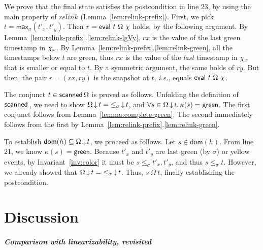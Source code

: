\documentclass[a4paper,UKenglish]{lipics-v2016}
\newcommand{\ie}{\emph{i.e.}\xspace}
\newcommand{\dom}[1]{\mathsf{dom}(#1)}
\newcommand{\aux}[1]{\textit{#1}}
\newcommand{\kw}[1]{\text{\textbf{#1}}}
\newcommand{\hist}{\chi}
\newcommand{\ldot}{\mathord{.}\,}
\def\ordlist{\sigma}
\newcommand{\C}{\kappa}
\newcommand{\tleq}{\mathrel{\leq_\ordlist}}
\newcommand{\stableorder}{\Omega}
\newcommand{\var}[1]{\mathit{#1}}
\def\lat{\langle}
\def\rat{\rangle}
\theoremstyle{definition}
\begin{document}


We prove that the final state satisfies the postcondition in line 23,
by using the main property of $\aux{relink}$
(Lemma~\ref{lem:relink-prefix}).
%
First, we pick $t = \mathsf{max}_{\ordlist}(t'_x, t'_y)$. Then $r =
\eval\ t\ \stableorder\ \hist$ holds, by the following argument. By
Lemma~\ref{lem:relink-prefix}.\ref{lem:relink-lgVy}, $rx$ is the value
of the last green timestamp in $\histx$. By
Lemma~\ref{lem:relink-prefix}.\ref{lem:relink-green}, all the
timestamps below $t$ are green, thus $rx$ is the value of the
\emph{last} timestamp in $\histx$ that is smaller or equal to $t$.  By
a symmetric argument, the same holds of $ry$. But then, the pair $r =
(rx, ry)$ is the snapshot at $t$, \ie, equals
$\eval\ t\ \stableorder\ \hist$.

The conjunct $t \in \scanned{\stableorder}$ is proved as
follows. Unfolding the definition of $\scanned$, we need to show
$\ideal{\stableorder}{t} = \ideal{{\tleq}}{t}$, and $\forall s\in
\ideal{\stableorder}{t}\ldot \C(s) = \mathsf{green}$.  The first
conjunct follows from Lemma~\ref{lemma:complete-green}. The second
immediately follows from the first by
Lemma~\ref{lem:relink-prefix}.\ref{lem:relink-green}.

To establish $\dom{h} \subseteq \ideal{\stableorder}{t}$, we proceed
as follows. Let $s \in \dom{h}$. From line 21, we know $\C(s) =
\mathsf{green}$. Because $t'_x$ and $t'_y$ are last green (by
$\ordlist$) or yellow events, by Invariant~\ref{inv:color} it must be
$s \tleq t'_x, t'_y$, and thus $s \tleq t$. However, we already showed
that $\ideal{\stableorder}{t} = \ideal{{\tleq}}{t}$. Thus,
$s\ {\stableorder}\ t$, finally establishing the postcondition.

%

\section{Discussion}
\label{sc:discussion}

\subparagraph*{Comparison with linearizability, revisited}
  
\end{document}
